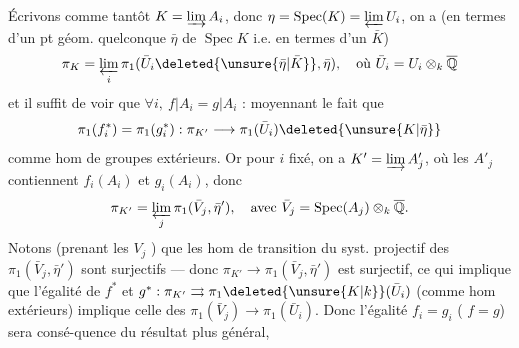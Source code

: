 Écrivons comme tantôt $K=\varinjlim A_i$, donc  $\eta=\operatorname{Spec}(K)=\varprojlim U_i$, on a (en termes d'un pt géom. quelconque $\bar\eta$ de $\operatorname{Spec}K$ i.e. en termes d'un $\bar K$)
\[
\pi_K=\varprojlim_i\pi_1(\bar U_i\deleted{\unsure{\bar\eta|\bar K}},\bar\eta),\quad\text{où }\bar U_i=U_i\otimes_k\overline{\mathbb Q}
\]
et il suffit de voir que $\forall i,\ f|A_i=g|A_i$ : moyennant le fait que
\[
\pi_1(f_i^*)=\pi_1(g_i^*):\pi_{K'}\longrightarrow\pi_1(\bar U_i)\deleted{\unsure{K|\bar\eta}}
\]
comme hom de groupes extérieurs. Or pour $i$ fixé, on a $K'=\varinjlim A'_j$, où les $A'_j$ contiennent $f_i(A_i)$ et $g_i(A_i)$, donc
\[
\pi_{K'}=\varprojlim_j\pi_1(\bar V_j,\bar\eta'),\quad\text{avec }\bar V_j=\operatorname{Spec}(A_j)\otimes_k\overline{\mathbb Q}.
\]
Notons (prenant les $V_j$ ) que les hom de transition du syst. projectif des $\pi_1(\bar V_j,\bar\eta')$ sont surjectifs --- donc $\pi_{K'}\longrightarrow\pi_1(\bar V_j,\bar\eta')$ est surjectif, ce qui implique que l'égalité de $f^*$ et $g^*:\pi_{K'}\rightrightarrows\pi_1\deleted{\unsure{K|k}}(\bar U_i)$ (comme hom extérieurs) implique celle des $\pi_1(\bar V_j)\longrightarrow\pi_1(\bar U_i)$.
Donc l'égalité $f_i=g_i$ ( $f=g$) sera consé-quence du résultat plus général,
